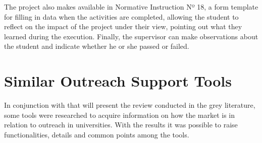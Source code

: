 
The project also makes available in Normative Instruction Nº 18, a form template for filling in data when the activities are completed, allowing the student to reflect on the impact of the project under their view, pointing out what they learned during the execution.
Finally, the supervisor can make observations about the student and indicate whether he or she passed or failed.
\section{Similar Outreach Support Tools}\label{sec:3.3}


In conjunction with  that will present the review conducted in the grey literature, some tools were researched to acquire information on how the market is in relation to outreach in universities.
With the results it was possible to raise functionalities, details and common points among the tools.


